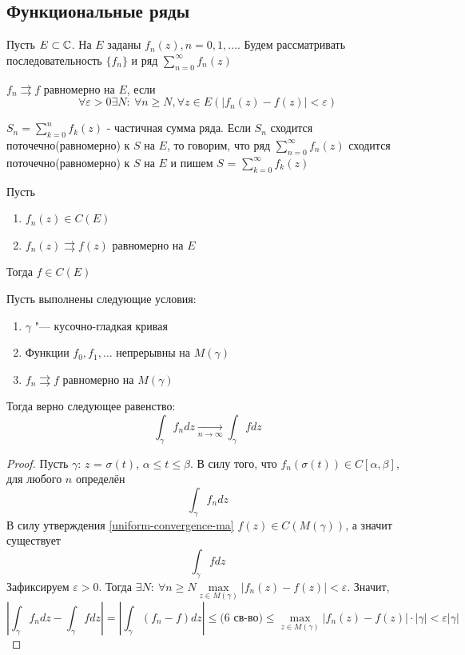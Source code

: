 \bigskip
\subsection*{Функциональные ряды}

Пусть $E \subset \mathbb{C}$. На $E$ заданы $f_n(z), n = 0,1,...$. Будем рассматривать последовательность $\{f_n\}$ и ряд $\sum\limits_{n=0}^{\infty}f_n(z)$
\begin{definition}
    $f_n \rightrightarrows f$ равномерно на $E$, если
    $$\forall \varepsilon > 0 \exists N : \ \forall n \geq N, \forall z \in E \left( |f_n(z) - f(z)| < \varepsilon\right)$$
\end{definition}
\begin{definition}
$S_n = \sum\limits_{k=0}^{n}f_k(z) $ - частичная сумма ряда. Если $S_n$ сходится поточечно(равномерно) к $S$ на $E$, то говорим, что ряд $\sum\limits_{n=0}^{\infty}f_n(z)$ сходится поточечно(равномерно) к $S$ на $E$ и пишем $S$ = $\sum\limits_{k=0}^{\infty}f_k(z)$
\end{definition}
\begin{proposition}[из МА]\label{uniform-convergence-ma}
 Пусть 
 \begin{enumerate}
 \item $f_n(z) \in C(E)$
 \item $f_n(z) \rightrightarrows f(z)$ равномерно на $E$
 \end{enumerate}
 Тогда $f \in C(E)$
\end{proposition}
\begin{proposition}
	Пусть выполнены следующие условия:
	\begin{enumerate}
		\item $\gamma$ "--- кусочно-гладкая кривая
		\item Функции $f_0, f_1, \dotsc$ непрерывны на $M(\gamma)$ 
		\item $f_n \rightrightarrows f$ равномерно на $M(\gamma)$ 
	\end{enumerate}
	
	Тогда верно следующее равенство:
	\[\int_\gamma f_ndz \xrightarrow[n \to \infty]{} \int_\gamma fdz\]
\end{proposition}

\begin{proof}
	Пусть $\gamma$: $z$ = $\sigma(t)$, $\alpha \leq t \leq \beta$. В силу того, что  $f_n(\sigma(t)) \in C[\alpha, \beta]$, для любого \(n\) определён
 \[\int_\gamma f_ndz \]  
 В силу утверждения \ref{uniform-convergence-ma} $f(z) \in C(M(\gamma))$, а значит существует \[\int_\gamma fdz \]
 Зафиксируем  $\varepsilon > 0$. Тогда $\exists N : \ \forall n \geq N \max\limits_{z \in M(\gamma)} \left|f_n(z) - f(z) \right| < \varepsilon$. Значит, \[\left| \int_\gamma f_ndz - \int_\gamma fdz \right| = \left|\int_\gamma (f_n - f)dz \right| \leqslant \text{(6 св-во)} \leqslant \max\limits_{z \in M(\gamma)} \left|f_n(z) - f(z) \right| \cdot \left| \gamma \right| < \varepsilon |\gamma|\]
\end{proof}

